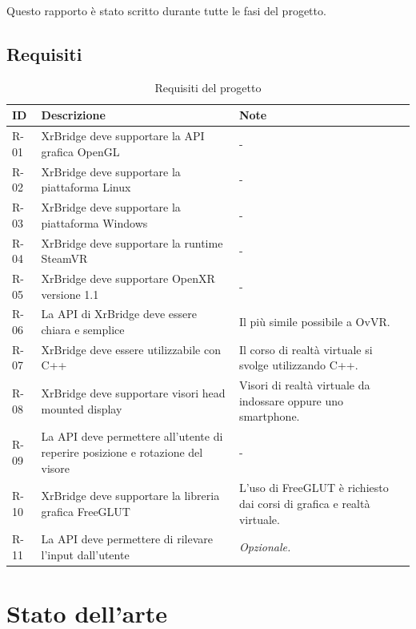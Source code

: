 \documentclass[twoside]{supsistudent}
\begin{document}
Questo rapporto è stato scritto durante tutte le fasi del progetto.

\newpage

\section{Requisiti}

\begin{table}[H]
  \caption{Requisiti del progetto}
  \begin{center}
    \begin{tabular}{ | m{1cm} | m{6cm} | m{6cm} | }
      \hline
      ID   & Descrizione & Note \\
      \hline
      R-01 & XrBridge deve supportare la API grafica OpenGL & - \\
      \hline
      R-02 & XrBridge deve supportare la piattaforma Linux & - \\
      \hline
      R-03 & XrBridge deve supportare la piattaforma Windows & - \\
      \hline
      R-04 & XrBridge deve supportare la runtime SteamVR & - \\
      \hline
      R-05 & XrBridge deve supportare OpenXR versione 1.1 & - \\
      \hline
      R-06 & La API di XrBridge deve essere chiara e semplice & Il più simile possibile a OvVR. \\
      \hline
      R-07 & XrBridge deve essere utilizzabile con C++ & Il corso di realtà virtuale si svolge utilizzando C++. \\
      \hline
      R-08 & XrBridge deve supportare visori head mounted display & Visori di realtà virtuale da indossare oppure uno smartphone. \\
      \hline
      R-09 & La API deve permettere all'utente di reperire posizione e rotazione del visore & - \\
      \hline
      R-10 & XrBridge deve supportare la libreria grafica FreeGLUT & L'uso di FreeGLUT è richiesto dai corsi di grafica e realtà virtuale. \\
      \hline
      R-11 & La API deve permettere di rilevare l'input dall'utente & \textit{Opzionale.} \\
      \hline
    \end{tabular}
  \end{center}
\end{table}

\chapter{Stato dell'arte}
\end{document}

